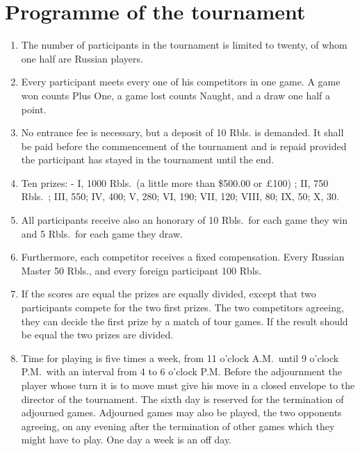 
\chapter{Programme of the tournament}

\begin{enumerate}
\item The number of participants in the tournament is limited to twenty, of whom one half are Russian players.

\item Every participant meets every one of his competitors in one game. A game won counts Plus One, a game lost counts Naught, and a draw one half a point.

\item No entrance fee is necessary, but a deposit of 10 Rbls. is demanded. It shall be paid before the commencement of the tournament and is repaid provided the participant has stayed in the tournament until the end.

\item Ten prizes: - I, 1000 Rbls.~(a little more than \$500.00 or \pounds 100) ; II, 750 Rbls.~; III, 550; IV, 400; V, 280; VI, 190; VII, 120; VIII, 80; IX, 50; X, 30.

\item All participants receive also an honorary of 10 Rbls.~for each game they win and 5 Rbls.~for each game they draw.

\item Furthermore, each competitor receives a fixed compensation. Every Russian Master 50 Rbls., and every foreign participant 100 Rbls.

\item If the scores are equal the prizes are equally divided, except that two participants compete for the two first prizes. The two competitors agreeing, they can decide the first prize by a match of tour games. If the result should be equal the two prizes are divided.

\item Time for playing is five times a week, from 11 o'clock A.M.~until 9 o'clock P.M.~with an interval from 4 to 6 o'clock P.M. Before the adjournment the player whose turn it is to move must give his move in a closed envelope to the director of the tournament. The sixth day is reserved for the termination of adjourned games. Adjourned games may also be played, the two opponents agreeing, on any evening after the termination of other games which they might have to play. One day a week is an off day.


\end{enumerate}
